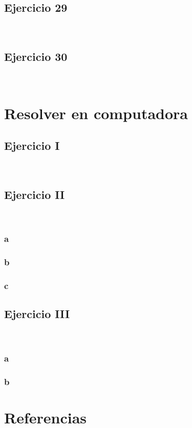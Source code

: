 \documentclass{article}
\begin{document}
\subsection*{Ejercicio 29}

\

\subsection*{Ejercicio 30}

\

\section*{Resolver en computadora}

\subsection*{Ejercicio I}

\

\subsection*{Ejercicio II}

\

\subsubsection*{a}

\subsubsection*{b}

\subsubsection*{c}

\subsection*{Ejercicio III}

\

\subsubsection*{a}

\subsubsection*{b}

\section*{Referencias}

\
\end{document}
